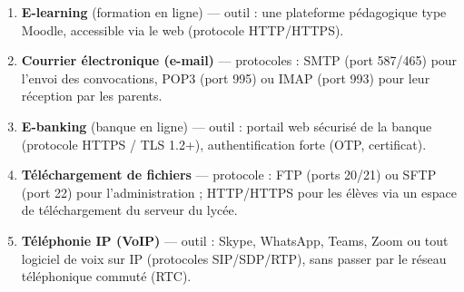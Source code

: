 \documentclass[11pt]{article}
\begin{document}
\begin{corrige}
\begin{enumerate}
    \item \textbf{E-learning} (formation en ligne) — outil : une plateforme pédagogique type Moodle, accessible via le web (protocole HTTP/HTTPS).
    \item \textbf{Courrier électronique (e-mail)} — protocoles : SMTP (port 587/465) pour l'envoi des convocations, POP3 (port 995) ou IMAP (port 993) pour leur réception par les parents.
    \item \textbf{E-banking} (banque en ligne) — outil : portail web sécurisé de la banque (protocole HTTPS / TLS 1.2+), authentification forte (OTP, certificat).
    \item \textbf{Téléchargement de fichiers} — protocole : FTP (ports 20/21) ou SFTP (port 22) pour l'administration ; HTTP/HTTPS pour les élèves via un espace de téléchargement du serveur du lycée.
    \item \textbf{Téléphonie IP (VoIP)} — outil : Skype, WhatsApp, Teams, Zoom ou tout logiciel de voix sur IP (protocoles SIP/SDP/RTP), sans passer par le réseau téléphonique commuté (RTC).
\end{enumerate}
\end{corrige}
\end{document}
